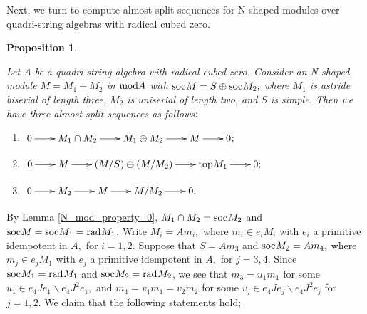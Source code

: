 \documentclass[10pt]{amsart}
\newtheorem{Prop}[Theo]{Proposition}
\theoremstyle{definition}
\newcommand{\mmod}{{\rm mod}}
\newcommand{\rad}{{\rm rad}\hspace{.5pt}}
\newcommand{\soc}{{\rm soc}\hspace{.5pt}}
\newcommand{\ntop}{{\rm top}\hspace{.5pt}}
\newcommand{\hp}{\hspace{.5pt}}
\begin{document}

\vspace{5pt}

Next, we turn to compute almost split sequences for N-shaped modules over quadri-string algebras with radical cubed zero.


\begin{Prop}\label{ass_Nmod}

Let $A$ be a quadri-string algebra with radical cubed zero. Consider an N-shaped module $M=M_1+M_2$ in $\mmod A$ with $\soc M = S \oplus \soc M_2,$ where $M_1$ is astride biserial of length three, $M_2$ is uniserial of length two, and $S$ is simple. Then we have three almost split sequences as follows$\hp:$

\begin{enumerate}[$(1)$]

\vspace{-1pt}
    
\item $\xymatrixcolsep{20pt}\xymatrix{0\ar[r] & M_1\cap M_2 \ar[r] & M_1\oplus M_2 \ar[r] & M \ar[r] & 0\hp;}$ 

\vspace{-3pt}

\item $\xymatrixcolsep{20pt}\xymatrix{0\ar[r] & M \ar[r] & (M / S) \oplus (M/M_2) \ar[r] & \ntop M_1 \ar[r] & 0;}$

\vspace{-3pt}

\item $\xymatrixcolsep{20pt}\xymatrix{0\ar[r] & M_2 \ar[r] & M \ar[r] & M/M_2 \ar[r] & 0.}$

\end{enumerate}\end{Prop}

\vspace{-2.5pt}

 By Lemma \ref{N_mod_property_0}, $M_1\cap M_2=\soc M_2$ and $\soc M=\soc M_1=\rad M_1$. Write $M_i=Am_i,$ where $m_i\in e_iM_i$ with $e_i$ a primitive idempotent in $A,$ for $i=1, 2.$ Suppose that $S=Am_3$ and $\soc M_2=Am_4,$ where $m_j\in e_j M_1$ with $e_j$ a primitive idempotent in $A,$ for $j=3, 4$. Since $\soc M_1=\rad M_1$ and $\soc M_2=\rad M_2$, we see that $m_3=u_1m_1$ for some $u_1\in e_4Je_1\backslash e_4J^2e_1,$ and $m_4=v_1m_1=v_2m_2$ for some $v_j\in e_4Je_j\backslash e_4J^2e_j$ for $j=1, 2$. We claim that the following statements hold;
\end{document}
